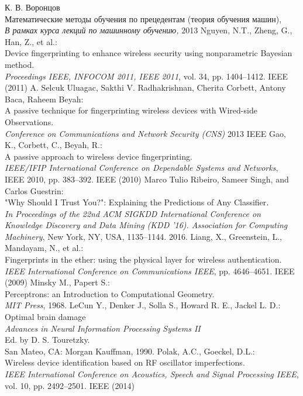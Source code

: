 \documentclass{mipt-thesis-bs}
\begin{document}
\begin{thebibliography}{99}
        К. В. Воронцов \\Математические методы обучения по прецедентам
(теория обучения машин), \\\emph{В рамках курса лекций по машинному обучению,} 2013
        Nguyen, N.T., Zheng, G., Han, Z., et al.: \\Device fingerprinting to enhance wireless security using nonparametric Bayesian method. \\\emph{ Proceedings IEEE, INFOCOM 2011, IEEE 2011}, vol. 34, pp. 1404–1412. IEEE (2011)
        A. Selcuk Uluagac, Sakthi V. Radhakrishnan, Cherita Corbett, Antony Baca, Raheem Beyah:\\ A passive technique for fingerprinting wireless devices with Wired-side Observations.\\ \emph{Conference on Communications and Network Security (CNS)} 2013 IEEE
        Gao, K., Corbett, C., Beyah, R.: \\A passive approach to wireless device fingerprinting. \\\emph{ IEEE/IFIP International Conference on Dependable Systems and Networks}, IEEE 2010, pp. 383–392. IEEE (2010)
        Marco Tulio Ribeiro, Sameer Singh, and Carlos Guestrin:  \\"Why Should I Trust You?": Explaining the Predictions of Any Classifier. \\ \emph{ In Proceedings of the 22nd ACM SIGKDD International Conference on Knowledge Discovery and Data Mining (KDD '16). Association for Computing Machinery}, New York, NY, USA, 1135–1144. 2016.
        Liang, X., Greenstein, L., Mandayam, N., et al.: \\Fingerprints in the ether: using the physical layer for wireless authentication. \\\emph{ IEEE International Conference on Communications IEEE}, pp. 4646–4651. IEEE (2009)
        Minsky M., Papert S.:\\
        Perceptrons: an Introduction to Computational Geometry. \\
        \emph{MIT Press}, 1968.
        LeCun Y., Denker J., Solla S., Howard R. E., Jackel L. D.:\\
        Optimal brain damage \\
        \emph{Advances in Neural Information Processing Systems II} \\
        Ed. by D. S. Touretzky. \\
        San Mateo, CA: Morgan Kauffman, 1990.
        Polak, A.C., Goeckel, D.L.: \\Wireless device identification based on RF oscillator imperfections. \\\emph{ IEEE International Conference on Acoustics, Speech and Signal Processing IEEE}, vol. 10, pp. 2492–2501. IEEE (2014)
    \end{thebibliography}
\end{document}
